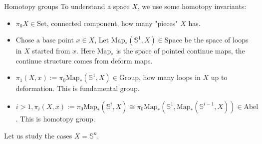 \documentclass[12pt]{beamer}
\begin{document}
\begin{frame}{Homotopy groups}
To understand a space $X$, we use some homotopy invariants:
\pause
\begin{itemize}
  \item $\pi_0 X \in \mathrm{Set} $, connected component, how many "pieces" $X$ has. 
    \pause
  \item Chose a base point $x\in X$, Let $ \mathrm{Map}_*(\mathbb{S}^1,X)  \in \mathrm{Space}$ be the space of loops in $X$ started from $x$. Here $\mathrm{Map}_*$ is the space of pointed continue maps, the continue structure comes from deform maps. 
    \pause
  \item $ \pi_1(X,x) := \pi_0\mathrm{Map}_*(\mathbb{S}^1,X) \in \mathrm{Group}$, how many loops in $X$ up to deformation. This is fundamental group.
    \pause
  \item $i>1, \pi_i(X,x) := \pi_0\mathrm{Map}_*(\mathbb{S}^i,X)\cong \pi_0\mathrm{Map}_*(\mathbb{S}^1,\mathrm{Map}_*(\mathbb{S}^{i-1},X)) \in \mathrm{Abel}$. This is homotopy group.
\end{itemize}
\pause
Let us study the cases $X=\mathbb{S}^n$.
\end{frame}
\end{document}
